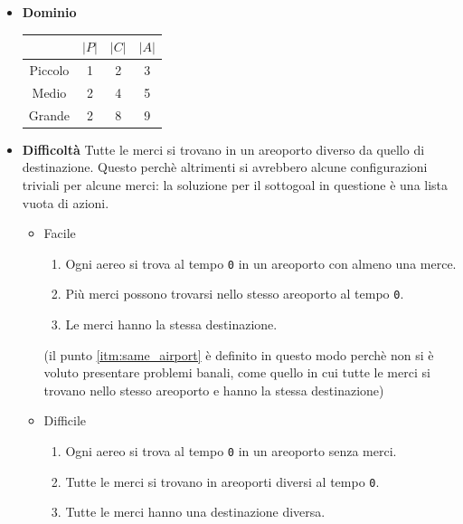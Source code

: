 \documentclass[a4paper,oneside,12pt]{book}
\begin{document}
    \begin{itemize}
        \item \textbf{Dominio}

        \begin{tabular}{|c | c| c |c |}
            \hline
            &$|P|$&$|C|$&$|A|$\\
            \hline
            Piccolo &1&2&3\\
            \hline
            Medio   &2&4&5\\
            \hline
            Grande  &2&8&9\\
            \hline
        \end{tabular}
        \item \textbf{Difficoltà}
        Tutte le merci si trovano in un areoporto diverso da quello di destinazione.
        Questo perchè altrimenti si avrebbero alcune configurazioni triviali per alcune merci: la soluzione per il
        sottogoal in questione è una lista vuota di azioni.
        \begin{itemize}

            \item Facile
            \begin{enumerate}
                \item Ogni aereo si trova al tempo \texttt{0} in un areoporto con almeno una merce.
                \item Più merci possono trovarsi nello stesso areoporto al tempo \texttt{0}. \label{itm:same_airport}
                \item Le merci hanno la stessa destinazione.
            \end{enumerate}
            (il punto \ref{itm:same_airport} è definito in questo modo perchè non si è voluto presentare problemi
            banali, come quello in cui tutte le merci si trovano nello stesso areoporto e hanno la stessa destinazione)\\
            \item Difficile
            \begin{enumerate}
                \item Ogni aereo si trova al tempo \texttt{0} in un areoporto senza merci.
                \item Tutte le merci si trovano in areoporti diversi al tempo \texttt{0}.
                \item Tutte le merci hanno una destinazione diversa.
            \end{enumerate}
        \end{itemize}
    \end{itemize}
\end{document}
